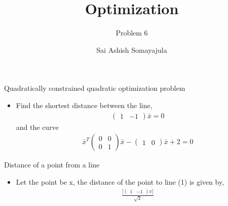 \documentclass{beamer}
\title{Optimization}
\subtitle{Problem 6}
\author{Sai Ashish Somayajula\inst{1}}
\institute[Universities of Somewhere and Elsewhere] %
{
  \inst{1}%
  EE16BTECH11043
  }
\begin{document}
\begin{frame}
  \titlepage
\end{frame}




\begin{frame}{Quadratically constrained quadratic optimization problem}
  \begin{itemize}
  \item {
Find the shortest distance between the line,
 \begin{align}
\begin{pmatrix}
		1 & -1
		\end{pmatrix}\bar{x}=0
 \end{align}
 and the curve
 \begin{align}
  \bar{x}^{T}\begin{pmatrix}
		0 & 0\\
		0 & 1
		\end{pmatrix}\bar{x}-\begin{pmatrix}
		1 & 0
		\end{pmatrix}\bar{x}+2=0
 \end{align}

  }
  \end{itemize}
  
\end{frame}

\begin{frame}{Distance of a point from a line}
    \begin{itemize}
  \item {
Let the point be x, the distance of the point to line (1) is given by,
 \begin{align}
\frac{|\begin{pmatrix}
		1 & -1
		\end{pmatrix}x|}{\sqrt{2}}
 \end{align}
 

  }
  \end{itemize}
 
\end{frame}
\end{document}
